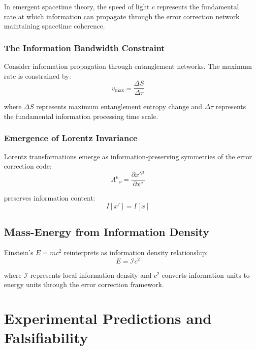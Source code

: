\documentclass[12pt]{article}
\begin{document}
In emergent spacetime theory, the speed of light $c$ represents the fundamental rate at which information can propagate through the error correction network maintaining spacetime coherence.

\subsubsection{The Information Bandwidth Constraint}

Consider information propagation through entanglement networks. The maximum rate is constrained by:
\begin{equation}
v_{\text{max}} = \frac{\Delta S}{\Delta \tau}
\end{equation}

where $\Delta S$ represents maximum entanglement entropy change and $\Delta \tau$ represents the fundamental information processing time scale.

\subsubsection{Emergence of Lorentz Invariance}

Lorentz transformations emerge as information-preserving symmetries of the error correction code:
\begin{equation}
\Lambda^\mu{}_\nu = \frac{\partial x'^\mu}{\partial x^\nu}
\end{equation}

preserves information content:
\begin{equation}
I[x'] = I[x]
\end{equation}

\subsection{Mass-Energy from Information Density}

Einstein's $E = mc^2$ reinterprets as information density relationship:
\begin{equation}
E = \mathcal{I} c^2
\end{equation}

where $\mathcal{I}$ represents local information density and $c^2$ converts information units to energy units through the error correction framework.

\section{Experimental Predictions and Falsifiability}
\end{document}
